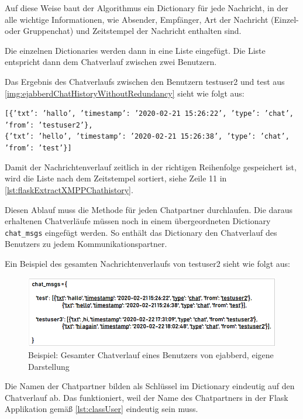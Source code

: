 \documentclass[a4paper,titlepage,halfparskip,12pt]{scrreprt}
\begin{document}
\begin{onehalfspacing}
Auf diese Weise baut der Algorithmus ein Dictionary für jede Nachricht, in der alle wichtige Informationen, wie Absender, Empfänger, Art der Nachricht (Einzel- oder Gruppenchat) und Zeitstempel der Nachricht enthalten sind.

Die einzelnen Dictionaries werden dann in eine Liste eingefügt. Die Liste entspricht dann dem Chatverlauf zwischen zwei Benutzern.

Das Ergebnis des Chatverlaufs zwischen den Benutzern testuser2 und test aus \autoref{img:ejabberdChatHistoryWithoutRedundancy} sieht wie folgt aus:

\texttt{[\{'txt': 'hallo', 'timestamp': '2020-02-21 15:26:22', 'type': 'chat', 'from': 'testuser2'\},} \\ \texttt{\{'txt': 'hello', 'timestamp': '2020-02-21 15:26:38', 'type': 'chat', 'from': 'test'\}]}

Damit der Nachrichtenverlauf zeitlich in der richtigen Reihenfolge gespeichert ist, wird die Liste nach dem Zeitstempel sortiert, siehe Zeile 11 in \autoref{lst:flaskExtractXMPPChathistory}.

Diesen Ablauf muss die Methode für jeden Chatpartner durchlaufen. Die daraus erhaltenen Chatverläufe müssen noch in einem übergeordneten Dictionary \texttt{chat\_msgs} eingefügt werden. So enthält das Dictionary den Chatverlauf des Benutzers zu jedem Kommunikationspartner.

Ein Beispiel des gesamten Nachrichtenverlaufs von testuser2 sieht wie folgt aus:

\begin{figure}[h]
	\centering
	\includegraphics[width=\textwidth]{images/ejabberdExampleFullChathistory}
	\caption{Beispiel: Gesamter Chatverlauf eines Benutzers von ejabberd, eigene Darstellung}
	\label{img:ejabberdExampleFullChathistory}
\end{figure}

Die Namen der Chatpartner bilden als Schlüssel im Dictionary eindeutig auf den Chatverlauf ab. Das funktioniert, weil der Name des Chatpartners in der Flask Applikation gemäß \autoref{lst:classUser} eindeutig sein muss.


\end{onehalfspacing}
\end{document}
